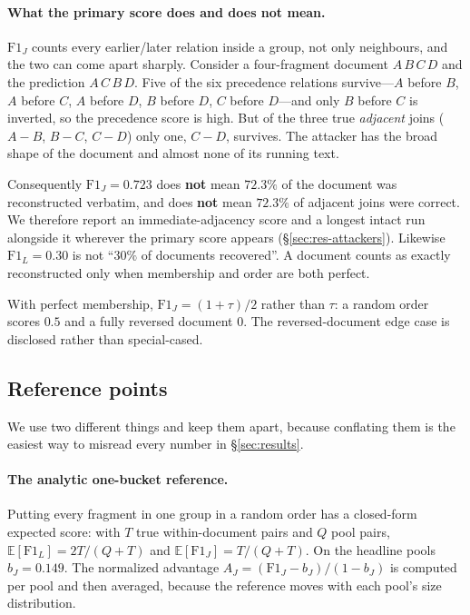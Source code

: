 \documentclass[sigconf,review]{acmart}
\newcommand{\FJ}{\ensuremath{\mathrm{F1}_{J}}}
\newcommand{\FL}{\ensuremath{\mathrm{F1}_{L}}}
\newcommand{\bJ}{\ensuremath{b_{J}}}
\newcommand{\AJ}{\ensuremath{A_{J}}}
\begin{document}
\paragraph{What the primary score does and does not mean.}
\FJ{} counts every earlier/later relation inside a group, not only
neighbours, and the two can come apart sharply. Consider a four-fragment
document $A\,B\,C\,D$ and the prediction $A\,C\,B\,D$. Five of the six
precedence relations survive---$A$ before $B$, $A$ before $C$, $A$ before $D$,
$B$ before $D$, $C$ before $D$---and only $B$ before $C$ is inverted, so the
precedence score is high. But of the three true \emph{adjacent} joins
($A\!-\!B$, $B\!-\!C$, $C\!-\!D$) only one, $C\!-\!D$, survives. The attacker
has the broad shape of the document and almost none of its running text.

Consequently $\FJ = 0.723$ does \textbf{not} mean $72.3\%$ of the document was
reconstructed verbatim, and does \textbf{not} mean $72.3\%$ of adjacent joins
were correct. We therefore report an immediate-adjacency score and a longest
intact run alongside it wherever the primary score appears
(\S\ref{sec:res-attackers}). Likewise $\FL = 0.30$ is not ``$30\%$ of documents
recovered''. A document counts as exactly reconstructed only when membership
and order are both perfect.

With perfect membership, $\FJ = (1+\tau)/2$ rather than $\tau$: a random order
scores $0.5$ and a fully reversed document $0$. The reversed-document edge case
is disclosed rather than special-cased.

\subsection{Reference points}
\label{sec:baselines}
We use two different things and keep them apart, because conflating them is the
easiest way to misread every number in \S\ref{sec:results}.

\paragraph{The analytic one-bucket reference.}
Putting every fragment in one group in a random order has a closed-form
expected score: with $T$ true within-document pairs and $Q$ pool pairs,
$\mathbb{E}[\FL] = 2T/(Q+T)$ and $\mathbb{E}[\FJ] = T/(Q+T)$. On the headline
pools $\bJ = 0.149$. The normalized advantage
$\AJ = (\FJ-\bJ)/(1-\bJ)$ is computed per pool and then averaged, because the
reference moves with each pool's size distribution.
\end{document}
